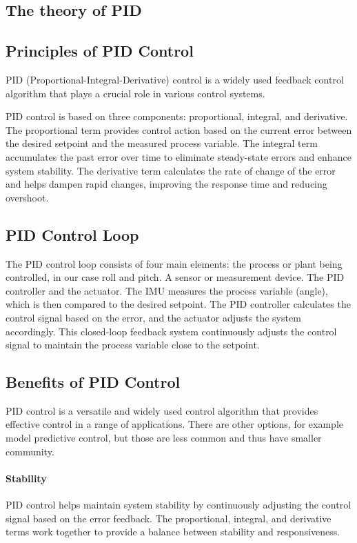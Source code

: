 \subsection{The theory of PID}

\subsection{Principles of PID Control}

PID (Proportional-Integral-Derivative) control is a widely used feedback control algorithm that plays a crucial role in various control systems. 

PID control is based on three components: proportional, integral, and derivative. The proportional term provides control action based on the current error between the desired setpoint and the measured process variable. The integral term accumulates the past error over time to eliminate steady-state errors and enhance system stability. The derivative term calculates the rate of change of the error and helps dampen rapid changes, improving the response time and reducing overshoot.

\subsection{PID Control Loop}

The PID control loop consists of four main elements: the process or plant being controlled, in our case roll and pitch. A sensor or measurement device. The PID controller and the actuator. The IMU measures the process variable (angle), which is then compared to the desired setpoint. The PID controller calculates the control signal based on the error, and the actuator adjusts the system accordingly. This closed-loop feedback system continuously adjusts the control signal to maintain the process variable close to the setpoint.

\subsection{Benefits of PID Control}

PID control is a versatile and widely used control algorithm that provides effective control in a range of applications. There are other options, for example model predictive control, but those are less common and thus have smaller community.

\paragraph{Stability}PID control helps maintain system stability by continuously adjusting the control signal based on the error feedback. The proportional, integral, and derivative terms work together to provide a balance between stability and responsiveness.
